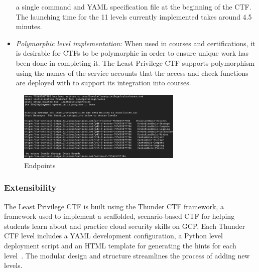 \begin{itemize}
  a single command and YAML specification file at the beginning of the CTF.  The launching time for the 11 levels currently implemented takes around 4.5 minutes.
  \item {\em Polymorphic level implementation}: When used in courses and certifications, it is desirable for CTFs to be polymorphic in order to ensure unique 
  work has been done in completing it.  The Least Privilege CTF supports polymorphism using the names of the service accounts that the access and check 
  functions are deployed with to support its integration into courses. 
\end{itemize}

\begin{figure}[h]
  \centering
  \includegraphics[width=0.7\textwidth]{pic/endpoints}
  \caption {Endpoints}
   \label{fig:endpoints}
\end{figure}
\subsubsection{Extensibility}
The Least Privilege CTF is built using the Thunder CTF framework, a framework used to implement a scaffolded, scenario-based CTF for helping
students learn about and practice cloud security skills on GCP.
Each Thunder CTF level includes a YAML development configuration, a Python level deployment script and an HTML template for generating the hints for
each level~\cite{Springer}. The modular design and structure streamlines the process of adding new levels.

